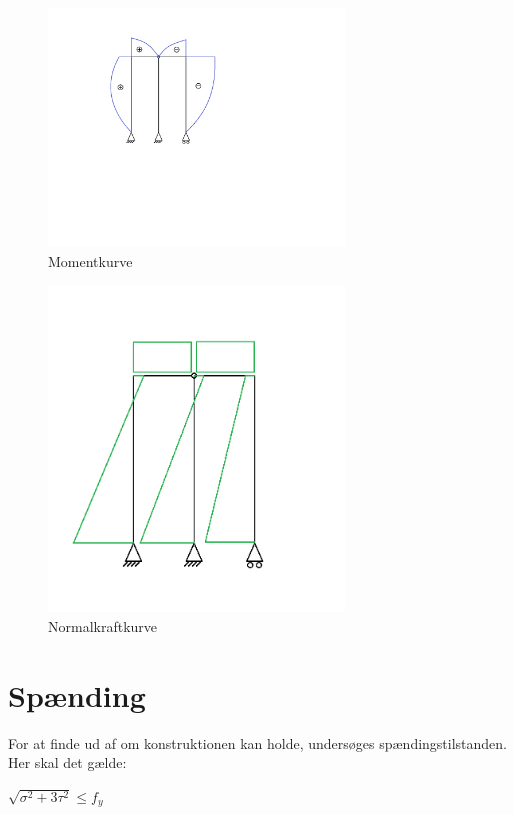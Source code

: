 \begin{figure}[H]
	\centering
	\includegraphics[width=0.7\textwidth]{billeder/skkm.png}
	\caption{Momentkurve}
	\label{fig:momentkurve}
\end{figure}

\begin{figure}[H]
	\centering
	\includegraphics[width=0.7\textwidth]{billeder/sfkn.png}
	\caption{Normalkraftkurve}
	\label{fig:normalkraftkurve}
\end{figure}

\section{Spænding}
For at finde ud af om konstruktionen kan holde, undersøges spændingstilstanden. Her skal det gælde:

\begin{center}
	$\sqrt{\sigma^2 + 3\tau^2} \le f_y$ 
\end{center}

